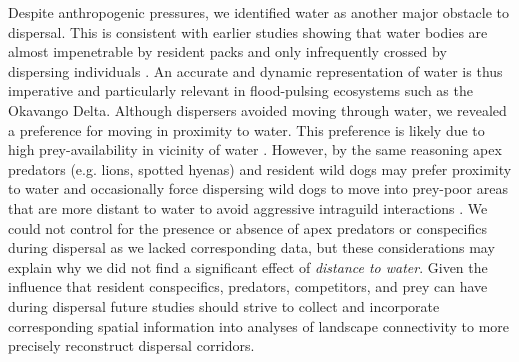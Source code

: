 \documentclass[abstract=on,10pt,a4paper,bibliography=totocnumbered]{article}
\begin{document}
Despite anthropogenic pressures, we identified water as another major obstacle
to dispersal. This is consistent with earlier studies showing that water bodies
are almost impenetrable by resident packs \citep{Abrahms.2017, Cozzi.2020} and
only infrequently crossed by dispersing individuals \citep{Cozzi.2020}. An
accurate and dynamic representation of water is thus imperative and particularly
relevant in flood-pulsing ecosystems such as the Okavango Delta. Although
dispersers avoided moving through water, we revealed a preference for moving in
proximity to water. This preference is likely due to high prey-availability in
vicinity of water \citep{Western.1975, Bonyongo.2005}. However, by the same
reasoning apex predators (e.g. lions, spotted hyenas) and resident wild dogs may
prefer proximity to water \citep{Valeix.2010} and occasionally force dispersing
wild dogs to move into prey-poor areas that are more distant to water
\citep{Ndaimani.2016} to avoid aggressive intraguild interactions
\citep{Creel.1996, Mills.1997, Webster.2012}. We could not control for the
presence or absence of apex predators or conspecifics during dispersal as we
lacked corresponding data, but these considerations may explain why we did not
find a significant effect of \textit{distance to water}. Given the influence
that resident conspecifics, predators, competitors, and prey can have during
dispersal \citep{Cozzi.2018, Armansin.2019} future studies should strive to
collect and incorporate corresponding spatial information into analyses of
landscape connectivity to more precisely reconstruct dispersal corridors.
\end{document}
